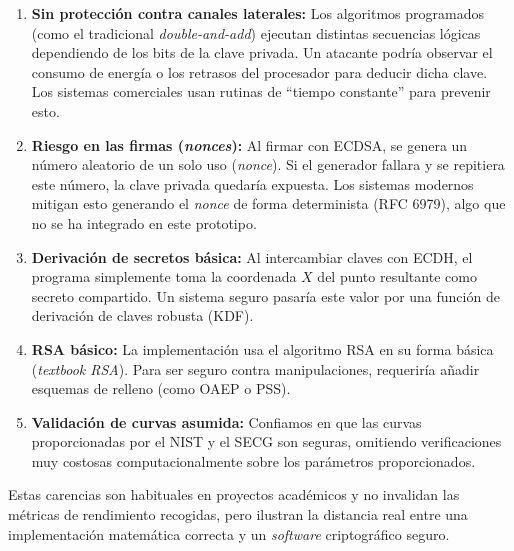 \begin{enumerate}
    \item \textbf{Sin protección contra canales laterales:} Los algoritmos programados (como el tradicional \textit{double-and-add}) ejecutan distintas secuencias lógicas dependiendo de los bits de la clave privada. Un atacante podría observar el consumo de energía o los retrasos del procesador para deducir dicha clave. Los sistemas comerciales usan rutinas de ``tiempo constante'' para prevenir esto.
    \item \textbf{Riesgo en las firmas (\textit{nonces}):} Al firmar con ECDSA, se genera un número aleatorio de un solo uso (\textit{nonce}). Si el generador fallara y se repitiera este número, la clave privada quedaría expuesta. Los sistemas modernos mitigan esto generando el \textit{nonce} de forma determinista (RFC 6979), algo que no se ha integrado en este prototipo.
    \item \textbf{Derivación de secretos básica:} Al intercambiar claves con ECDH, el programa simplemente toma la coordenada $X$ del punto resultante como secreto compartido. Un sistema seguro pasaría este valor por una función de derivación de claves robusta (KDF).
    \item \textbf{RSA básico:} La implementación usa el algoritmo RSA en su forma básica (\textit{textbook RSA}). Para ser seguro contra manipulaciones, requeriría añadir esquemas de relleno (como OAEP o PSS).
    \item \textbf{Validación de curvas asumida:} Confiamos en que las curvas proporcionadas por el NIST y el SECG son seguras, omitiendo verificaciones muy costosas computacionalmente sobre los parámetros proporcionados.
\end{enumerate}

\noindent Estas carencias son habituales en proyectos académicos y no invalidan las métricas de rendimiento recogidas, pero ilustran la distancia real entre una implementación matemática correcta y un \textit{software} criptográfico seguro.